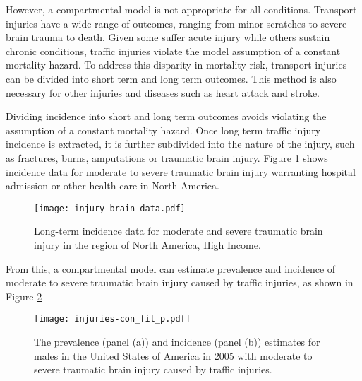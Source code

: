 However, a compartmental model is not appropriate for all conditions.  Transport injuries have a wide range of outcomes, ranging from minor scratches to severe brain trauma to death.  Given some suffer acute injury while others sustain chronic conditions, traffic injuries violate the model assumption of a constant mortality hazard.  To address this disparity in mortality risk, transport injuries can be divided into short term and long term outcomes.  This method is also necessary for other injuries and diseases such as heart attack and stroke.
 
Dividing incidence into short and long term outcomes avoids violating the assumption of a constant mortality hazard.  Once long term traffic injury incidence is extracted, it is further subdivided into the nature of the injury, such as fractures, burns, amputations or traumatic brain injury.  Figure \ref{fig:app-injury brain data} shows incidence data for moderate to severe traumatic brain injury warranting hospital admission or other health care in North America.

    \begin{figure}[h]
        \begin{center}
            \texttt{[image: injury-brain\_data.pdf]}
            \caption{Long-term incidence data for moderate and severe traumatic brain injury in the region of North America, High Income.}
            \label{fig:app-injury brain data}
        \end{center}
    \end{figure}

From this, a compartmental model can estimate prevalence and incidence of moderate to severe traumatic brain injury caused by traffic injuries, as shown in Figure \ref{fig:app-injury brain fit}

    \begin{figure}[h]
        \begin{center}
            \texttt{[image: injuries-con\_fit\_p.pdf]}
            \caption{The prevalence (panel (a)) and incidence (panel (b)) estimates for males in the United States of America in 2005 with moderate to severe traumatic brain injury caused by traffic injuries.}
            \label{fig:app-injury brain fit}
        \end{center}
    \end{figure}



